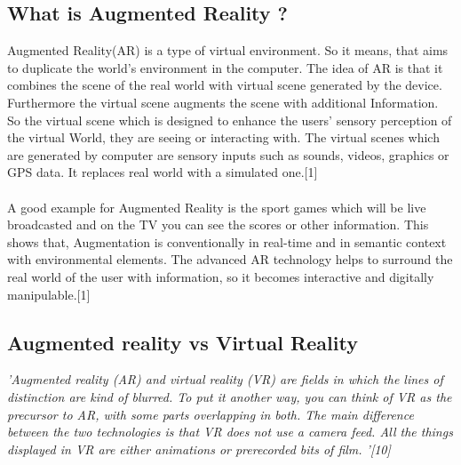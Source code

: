 \subsection{What is Augmented Reality ?}
Augmented Reality(AR) is a type of  virtual environment. So it means, that aims to duplicate the world’s environment in the computer. The idea of AR is that it combines the scene of the real world with virtual scene generated by the device. Furthermore the virtual scene augments the scene with additional Information. So the virtual scene which is designed to enhance the users’ sensory perception of the virtual World, they are seeing or interacting with. The virtual scenes which are generated by computer are sensory inputs such as sounds, videos, graphics or GPS data. It replaces real world with a simulated one.[1]
\\\\
A good example for Augmented Reality is the sport games which will be live broadcasted and on the TV you can see the scores or other information. This shows that,  Augmentation is conventionally in real-time and in semantic context with environmental elements. The advanced AR technology helps to surround the real world of the user with information, so it becomes interactive and digitally manipulable.[1]
\\
\subsection{Augmented reality vs Virtual Reality}

\textit{'Augmented reality (AR) and virtual reality (VR) are fields in which the lines of
distinction are kind of blurred. To put it another way, you can think of VR as the
precursor to AR, with some parts overlapping in both. The main difference
between the two technologies is that VR does not use a camera feed. All the
things displayed in VR are either animations or prerecorded bits of film.
'[10]}
